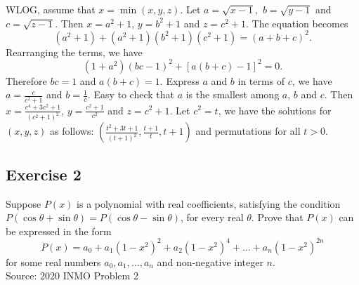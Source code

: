 \documentclass[12pt]{article}
\begin{document}
\begin{solution}

WLOG,  assume that $x = \min(x,y,z)$. Let $a=\sqrt{x-1},$ $b=\sqrt{y-1}$ and $c=\sqrt{z-1}$. Then $x=a^2+1$, $y=b^2+1$ and $z=c^2+1$. The equation becomes
$$(a^2+1)+(a^2+1)(b^2+1)(c^2+1)=(a+b+c)^2.$$
Rearranging the terms, we have 
$$(1+a^2)(bc-1)^2+[a(b+c)-1]^2=0.$$
Therefore $bc=1$ and $a(b+c)=1.$ Express $a$ and $b$ in terms of $c$, we have $a=\frac{c}{c^2+1}$ and $b=\frac{1}{c}.$ Easy to check that $a$ is the smallest among $a$, $b$ and $c.$ Then $x=\frac{c^4+3c^2+1}{(c^2+1)^2}$, $y=\frac{c^2+1}{c^2}$ and $z=c^2+1.$
Let $c^2=t$, we have the solutions for $(x,y,z)$ as follows:
$(\frac{t^2+3t+1}{(t+1)^2}, \frac{t+1}{t}, t+1)$ and permutations for all $t>0.$ 

\end{solution}

\vspace{5in}






\subsection*{Exercise 2}
Suppose $P(x)$ is a polynomial with real coefficients, satisfying the condition $P(\cos \theta+\sin \theta)=P(\cos \theta-\sin \theta)$, for every real $\theta$. Prove that $P(x)$ can be expressed in the form$$P(x)=a_0+a_1(1-x^2)^2+a_2(1-x^2)^4+\dots+a_n(1-x^2)^{2n}$$for some real numbers $a_0, a_1, \dots, a_n$ and non-negative integer $n$.\\

Source: 2020 INMO Problem 2 \\
\end{document}
